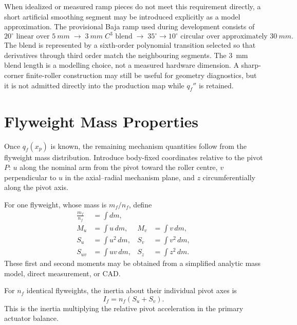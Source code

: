\documentclass[11pt]{report}
\numberwithin{equation}{section}
\begin{document}
When idealized or measured ramp pieces do not meet this requirement directly,
a short artificial smoothing segment may be introduced explicitly as a model
approximation. The provisional Baja ramp used during development consists of
\begin{equation}
    20^\circ\text{ linear over }\SI{5}{mm}
    \;\longrightarrow\;
    \SI{3}{mm}\;C^3\text{ blend}
    \;\longrightarrow\;
    35^\circ\rightarrow10^\circ\text{ circular over approximately }\SI{30}{mm}.
    \label{eq:appB_provisional_ramp}
\end{equation}
The blend is represented by a sixth-order polynomial transition selected so
that derivatives through third order match the neighbouring segments. The
\SI{3}{mm} blend length is a modelling choice, not a measured hardware
dimension. A sharp-corner finite-roller construction may still be useful for
geometry diagnostics, but it is not admitted directly into the production map
while \(q_f''\) is retained.

\section{Flyweight Mass Properties}
\label{app:flyweight_mass_geometry}

Once \(q_f(x_p)\) is known, the remaining mechanism quantities follow from the
flyweight mass distribution. Introduce body-fixed coordinates relative to the
pivot \(P\): \(u\) along the nominal arm from the pivot toward the roller
centre, \(v\) perpendicular to \(u\) in the axial--radial mechanism plane, and
\(z\) circumferentially along the pivot axis.

For one flyweight, whose mass is \(m_f/n_f\), define
\begin{align}
    \frac{m_f}{n_f} &= \int dm,\\
    M_u &= \int u\,dm,
    &M_v &= \int v\,dm,\\
    S_u &= \int u^2\,dm,
    &S_v &= \int v^2\,dm,\\
    S_{uv} &= \int uv\,dm,
    &S_z &= \int z^2\,dm.
    \label{eq:appB_general_mass_moments}
\end{align}
These first and second moments may be obtained from a simplified analytic mass
model, direct measurement, or CAD.

For \(n_f\) identical flyweights, the inertia about their individual pivot axes
is
\begin{equation}
    \boxed{
    I_f
    =
    n_f(S_u+S_v).
    }
    \label{eq:appB_If_general}
\end{equation}
This is the inertia multiplying the relative pivot acceleration in the primary
actuator balance.
\end{document}
